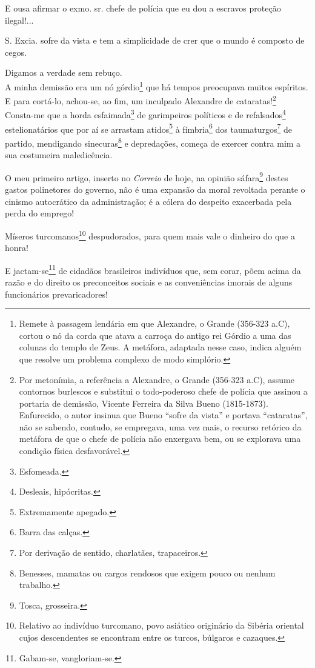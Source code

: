 E ousa afirmar o exmo. sr. chefe de polícia que eu dou a escravos
proteção ilegal!...

S. Excia. sofre da vista e tem a simplicidade de crer que o mundo é
composto de cegos.

Digamos a verdade sem rebuço.\\
A minha demissão era um nó górdio\footnote{Remete à passagem lendária
  em que Alexandre, o Grande (356-323 a.C), cortou o nó da corda que
  atava a carroça do antigo rei Górdio a uma das colunas do templo de
  Zeus. A metáfora, adaptada nesse caso, indica alguém que resolve um
  problema complexo de modo simplório.} que há tempos preocupava muitos
espíritos. E para cortá-lo, achou-se, ao fim, um inculpado Alexandre de
cataratas!\footnote{Por metonímia, a referência a Alexandre, o Grande
  (356-323 a.C), assume contornos burlescos e substitui o todo-poderoso
  chefe de polícia que assinou a portaria de demissão, Vicente Ferreira
  da Silva Bueno (1815-1873). Enfurecido, o autor insinua que Bueno
  ``sofre da vista'' e portava ``cataratas'', não se sabendo, contudo, se
  empregava, uma vez mais, o recurso retórico da metáfora de que o chefe
  de polícia não enxergava bem, ou se explorava uma condição física
  desfavorável.}\\
Consta-me que a horda esfaimada\footnote{Esfomeada.} de garimpeiros
políticos e de refalsados\footnote{Desleais, hipócritas.}
estelionatários que por aí se arrastam atidos\footnote{Extremamente
  apegado.} à fímbria\footnote{Barra das calças.} dos
taumaturgos\footnote{Por derivação de sentido, charlatães,
  trapaceiros.} de partido, mendigando sinecuras\footnote{Benesses,
  mamatas ou cargos rendosos que exigem pouco ou nenhum trabalho.} e
depredações, começa de exercer contra mim a sua costumeira maledicência.

O meu primeiro artigo, inserto no \emph{Correio} de hoje, na opinião
sáfara\footnote{Tosca, grosseira.} destes gastos polinetores do
governo, não é uma expansão da moral revoltada perante o cinismo
autocrático da administração; é a cólera do despeito exacerbada pela
perda do emprego!

Míseros turcomanos\footnote{Relativo ao indivíduo turcomano, povo
  asiático originário da Sibéria oriental cujos descendentes se
  encontram entre os turcos, búlgaros e cazaques.} despudorados, para
quem mais vale o dinheiro do que a honra!

E jactam-se\footnote{Gabam-se, vangloriam-se.} de cidadãos brasileiros
indivíduos que, sem corar, põem acima da razão e do direito os
preconceitos sociais e as conveniências imorais de alguns funcionários
prevaricadores!

